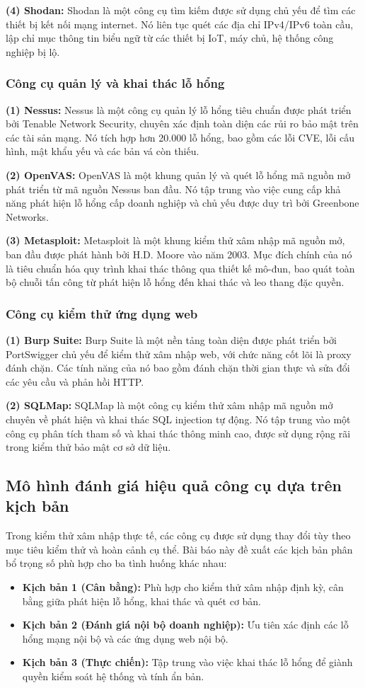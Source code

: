 \documentclass[conference]{IEEEtran}
\begin{document}
\textbf{(4) Shodan:} Shodan là một công cụ tìm kiếm được sử dụng chủ yếu để tìm các thiết bị kết nối mạng internet. Nó liên tục quét các địa chỉ IPv4/IPv6 toàn cầu, lập chỉ mục thông tin biểu ngữ từ các thiết bị IoT, máy chủ, hệ thống công nghiệp bị lộ.

\subsubsection{Công cụ quản lý và khai thác lỗ hổng}
\textbf{(1) Nessus:} Nessus là một công cụ quản lý lỗ hổng tiêu chuẩn được phát triển bởi Tenable Network Security, chuyên xác định toàn diện các rủi ro bảo mật trên các tài sản mạng. Nó tích hợp hơn 20.000 lỗ hổng, bao gồm các lỗi CVE, lỗi cấu hình, mật khẩu yếu và các bản vá còn thiếu.

\textbf{(2) OpenVAS:} OpenVAS là một khung quản lý và quét lỗ hổng mã nguồn mở phát triển từ mã nguồn Nessus ban đầu. Nó tập trung vào việc cung cấp khả năng phát hiện lỗ hổng cấp doanh nghiệp và chủ yếu được duy trì bởi Greenbone Networks.

\textbf{(3) Metasploit:} Metasploit là một khung kiểm thử xâm nhập mã nguồn mở, ban đầu được phát hành bởi H.D. Moore vào năm 2003. Mục đích chính của nó là tiêu chuẩn hóa quy trình khai thác thông qua thiết kế mô-đun, bao quát toàn bộ chuỗi tấn công từ phát hiện lỗ hổng đến khai thác và leo thang đặc quyền.

\subsubsection{Công cụ kiểm thử ứng dụng web}
\textbf{(1) Burp Suite:} Burp Suite là một nền tảng toàn diện được phát triển bởi PortSwigger chủ yếu để kiểm thử xâm nhập web, với chức năng cốt lõi là proxy đánh chặn. Các tính năng của nó bao gồm đánh chặn thời gian thực và sửa đổi các yêu cầu và phản hồi HTTP.

\textbf{(2) SQLMap:} SQLMap là một công cụ kiểm thử xâm nhập mã nguồn mở chuyên về phát hiện và khai thác SQL injection tự động. Nó tập trung vào một công cụ phân tích tham số và khai thác thông minh cao, được sử dụng rộng rãi trong kiểm thử bảo mật cơ sở dữ liệu.

\subsection{Mô hình đánh giá hiệu quả công cụ dựa trên kịch bản}
Trong kiểm thử xâm nhập thực tế, các công cụ được sử dụng thay đổi tùy theo mục tiêu kiểm thử và hoàn cảnh cụ thể. Bài báo này đề xuất các kịch bản phân bổ trọng số phù hợp cho ba tình huống khác nhau:
\begin{itemize}
    \item \textbf{Kịch bản 1 (Cân bằng):} Phù hợp cho kiểm thử xâm nhập định kỳ, cân bằng giữa phát hiện lỗ hổng, khai thác và quét cơ bản.
    \item \textbf{Kịch bản 2 (Đánh giá nội bộ doanh nghiệp):} Ưu tiên xác định các lỗ hổng mạng nội bộ và các ứng dụng web nội bộ.
    \item \textbf{Kịch bản 3 (Thực chiến):} Tập trung vào việc khai thác lỗ hổng để giành quyền kiểm soát hệ thống và tính ẩn bản.
\end{itemize}
\end{document}

